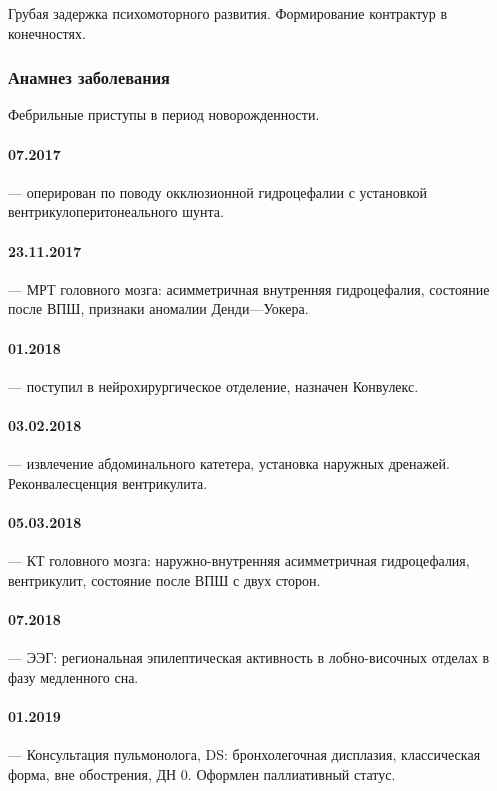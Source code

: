 \documentclass[a4paper,14pt]{extarticle}
\begin{document}
Грубая задержка психомоторного развития.
Формирование контрактур в конечностях.

\subsubsection*{Анамнез заболевания}

Фебрильные приступы в период новорожденности.

\paragraph{07.2017} --- оперирован по поводу окклюзионной гидроцефалии с установкой вентрикулоперитонеального шунта.

\paragraph{23.11.2017} --- МРТ головного мозга: асимметричная внутренняя гидроцефалия, состояние после ВПШ, признаки аномалии Денди---Уокера.

\paragraph{01.2018} --- поступил в нейрохирургическое отделение, назначен Конвулекс.

\paragraph{03.02.2018} --- извлечение абдоминального катетера, установка наружных дренажей. Реконвалесценция вентрикулита.

\paragraph{05.03.2018} --- КТ головного мозга: наружно-внутренняя асимметричная гидроцефалия, вентрикулит, состояние после ВПШ с двух сторон.

\paragraph{07.2018} --- ЭЭГ: региональная эпилептическая активность в лобно-височных отделах в фазу медленного сна.

\paragraph{01.2019} --- Консультация пульмонолога, DS: бронхолегочная дисплазия, классическая форма, вне обострения, ДН 0. Оформлен паллиативный статус.
\end{document}
